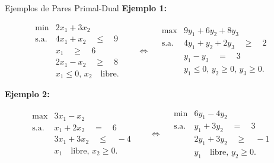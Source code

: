 \documentclass{beamer}
\begin{document}
\begin{frame}{Ejemplos de Pares Primal-Dual}
    \textbf{Ejemplo 1:}

    \[
    \begin{array}{lll}
    \text{min} & 2x_1 + 3x_2 & \\
    \text{s.a.} & 4x_1 + x_2 \quad \leq \quad 9 & \\
    & x_1 \quad \geq \quad 6 & \\
    & 2x_1 - x_2 \quad \geq \quad 8 & \\
    & x_1 \leq 0, \, x_2 \quad \text{libre}. &
    \end{array}
    \quad \Leftrightarrow \quad
    \begin{array}{lll}
    \text{max} & 9y_1 + 6y_2 + 8y_3 & \\
    \text{s.a.} & 4y_1 + y_2 + 2y_3 \quad \geq \quad 2 & \\
    & y_1 - y_3 \quad = \quad 3 & \\
    & y_1 \leq 0, \, y_2 \geq 0, \, y_3 \geq 0. &
    \end{array}
    \]

    \vspace{0.5cm}
    \textbf{Ejemplo 2:}

    \[
    \begin{array}{lll}
    \text{max} & 3x_1 - x_2 & \\
    \text{s.a.} & x_1 + 2x_2 \quad = \quad 6 & \\
    & 3x_1 + 3x_2 \quad \leq \quad -4 & \\
    & x_1 \quad \text{libre}, \, x_2 \geq 0. &
    \end{array}
    \quad \Leftrightarrow \quad
    \begin{array}{lll}
    \text{min} & 6y_1 - 4y_2 & \\
    \text{s.a.} & y_1 + 3y_2 \quad = \quad 3 & \\
    & 2y_1 + 3y_2 \quad \geq \quad -1 & \\
    & y_1 \quad \text{libre}, \, y_2 \geq 0. &
    \end{array}
    \]
\end{frame}
\end{document}
